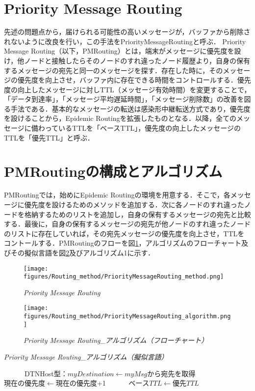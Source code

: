 \documentclass[11pt]{icsthesis}
\begin{document}
\section{Priority Message Routing}
先述の問題点から，届けられる可能性の高いメッセージが，バッファから削除されないように改良を行い，この手法をPriorityMessageRoutingと呼ぶ．
Priority Message Routing（以下，PMRouting）とは，端末がメッセージに優先度を設け，他ノードと接触したらそのノードのすれ違ったノード履歴より，自身の保有するメッセージの宛先と同一のメッセージを探す．存在した時に，そのメッセージの優先度を向上させ，バッファ内に存在できる時間をコントロールする．優先度の向上したメッセージに対しTTL（メッセージ有効時間）を変更することで，「データ到達率」，「メッセージ平均遅延時間」，「メッセージ削除数」の改善を図る手法である．基本的なメッセージの転送は感染形中継転送方式であり，優先度を設けることから，Epidemic Routingを拡張したものとなる．以降，全てのメッセージに備わっているTTLを「ベースTTL」，優先度の向上したメッセージのTTLを「優先TTL」と呼ぶ．

\section{PMRoutingの構成とアルゴリズム}
PMRoutingでは，始めにEpidemic Routingの環境を用意する．そこで，各メッセージに優先度を設けるためのメソッドを追加する．次に各ノードのすれ違ったノードを格納するためのリストを追加し，自身の保有するメッセージの宛先と比較する．最後に，自身の保有するメッセージの宛先が他ノードのすれ違ったノードのリストに存在していれば，その宛先メッセージの優先度を向上させ，TTLをコントールする．PMRoutingのフローを図\ref{PriorityMessageRouting}，アルゴリズムのフローチャート及びその擬似言語を図\ref{PriorityMessageRoutingalgo}及びアルゴリズム1に示す．

\begin{figure}[h]
	\centering
	\texttt{[image: figures/Routing\_method/PriorityMessageRouting\_method.png]}
	\caption[]{\it{Priority Message Routing}}
	\label{PriorityMessageRouting}
\end{figure}

\begin{figure}[h]
	\centering
	\texttt{[image: figures/Routing\_method/PriorityMessageRouting\_algorithm.png]}
	\caption[]{\it{Priority Message Routing\_アルゴリズム（フローチャート）}}
	\label{PriorityMessageRoutingalgo}
\end{figure}

\makeatletter
    \renewcommand{\ALG@name}{アルゴリズム}
    \makeatother
    \begin{algorithm}[tb]
    \caption{\it{Priority Message Routing\_アルゴリズム（擬似言語）}}
    \begin{algorithmic}[1]

    　　　\State DTNHost型：$myDestination \gets myMsg$から宛先を取得
            　　\State $現在の優先度 \gets 現在の優先度$+1
          　　　\State $ベースTTL \gets 優先TTL$
            \EndIf
    \EndFor
    \end{algorithmic}
    \end{algorithm}
\end{document}
